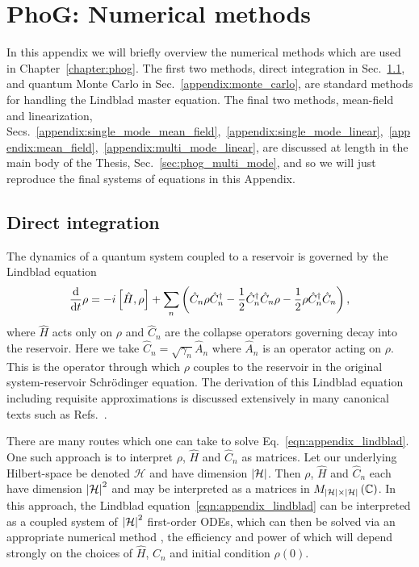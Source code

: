 \chapter{PhoG: Numerical methods}\label{appendix:phog_numerical_methods}

In this appendix we will briefly overview the numerical methods which are used in Chapter~\ref{chapter:phog}. The first two methods, direct integration in Sec.~\ref{appendix:direct_integration}, and quantum Monte Carlo in Sec.~\ref{appendix:monte_carlo}, are standard methods for handling the Lindblad master equation. %
The final two methods, mean-field and linearization, Secs.~\ref{appendix:single_mode_mean_field},~\ref{appendix:single_mode_linear},~\ref{appendix:mean_field},~\ref{appendix:multi_mode_linear}, are discussed at length in the main body of the Thesis, Sec.~\ref{sec:phog_multi_mode}, and so we will just reproduce the final systems of equations in this Appendix. %

\section{Direct integration}\label{appendix:direct_integration}

The dynamics of a quantum system coupled to a reservoir is governed by the Lindblad equation
\begin{equation}\label{eqn:appendix_lindblad}
\frac{\mathrm{d}}{\mathrm{d}t} \rho = - i \left[ \hat{H}, \rho \right] + \sum_n \left(\hat{C}_n \rho \hat{C}_n^\dagger - \frac{1}{2} \hat{C}_n^\dagger \hat{C}_n \rho - \frac{1}{2} \rho \hat{C}_n^\dagger \hat{C}_n \right),
\end{equation}
where $\hat{H}$ acts only on $\rho$ and $\hat{C}_n$ are the collapse operators governing decay into the reservoir. Here we take $\hat{C}_n = \sqrt{\gamma_n} \hat{A}_n$ where $\hat{A}_n$ is an operator acting on $\rho$. This is the operator through which $\rho$ couples to the reservoir in the original system-reservoir Schr{\"o}dinger equation. The derivation of this Lindblad equation including requisite approximations is discussed extensively in many canonical texts such as Refs.~\cite{Breuer2002, Carmichael1999}. 

There are many routes which one can take to solve Eq.~\ref{eqn:appendix_lindblad}. One such approach is to interpret $\rho$, $\hat{H}$ and $\hat{C}_n$ as matrices. Let our underlying Hilbert-space be denoted $\mathcal{H}$ and have dimension $\left|\mathcal{H}\right|$. Then $\rho$, $\hat{H}$ and $\hat{C}_n$ each have dimension $\left|\mathcal{H}\right|^2$ and may be interpreted as a matrices in $M_{\left|\mathcal{H}\right| \times \left|\mathcal{H}\right|}\left(\mathbb{C}\right)$. In this approach, the Lindblad equation~\ref{eqn:appendix_lindblad} can be interpreted as a coupled system of $\left|\mathcal{H}\right|^2$ first-order ODEs, which can then be solved via an appropriate numerical method \cite{Corless2013}, the efficiency and power of which will depend strongly on the choices of $\hat{H}$, $\hat{C}_n$ and initial condition $\rho\left(0\right)$.

